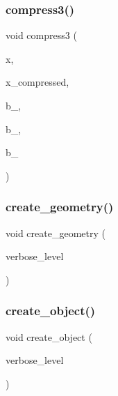 \subsubsection{\texorpdfstring{compress3()}{compress3()}}
{\footnotesize\ttfamily void compress3 (\begin{DoxyParamCaption}\item[{\mbox{\hyperlink{galois_8h_a09fddde158a3a20bd2dcadb609de11dc}{I\+NT}} $\ast$}]{x,  }\item[{\mbox{\hyperlink{galois_8h_a09fddde158a3a20bd2dcadb609de11dc}{I\+NT}} $\ast$}]{x\+\_\+compressed,  }\item[{\mbox{\hyperlink{galois_8h_a09fddde158a3a20bd2dcadb609de11dc}{I\+NT}}}]{b\+\_,  }\item[{\mbox{\hyperlink{galois_8h_a09fddde158a3a20bd2dcadb609de11dc}{I\+NT}}}]{b\+\_,  }\item[{\mbox{\hyperlink{galois_8h_a09fddde158a3a20bd2dcadb609de11dc}{I\+NT}}}]{b\+\_ }\end{DoxyParamCaption})}

\mbox{\label{hamming_8_c_abb255fb19bad84799f04dcf4ffddb57b}} 
\subsubsection{\texorpdfstring{create\+\_\+geometry()}{create\_geometry()}}
{\footnotesize\ttfamily void create\+\_\+geometry (\begin{DoxyParamCaption}\item[{\mbox{\hyperlink{galois_8h_a09fddde158a3a20bd2dcadb609de11dc}{I\+NT}}}]{verbose\+\_\+level }\end{DoxyParamCaption})}

\mbox{\label{hamming_8_c_a290a0a0fa4965131997904ad9fe1840b}} 
\subsubsection{\texorpdfstring{create\+\_\+object()}{create\_object()}}
{\footnotesize\ttfamily void create\+\_\+object (\begin{DoxyParamCaption}\item[{\mbox{\hyperlink{galois_8h_a09fddde158a3a20bd2dcadb609de11dc}{I\+NT}}}]{verbose\+\_\+level }\end{DoxyParamCaption})}

